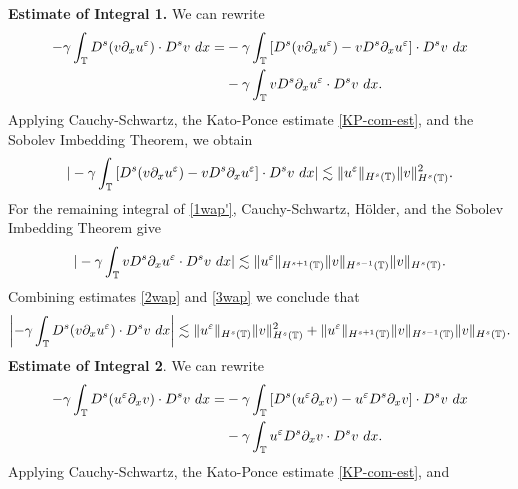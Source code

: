{\bf Estimate of Integral 1.} We can rewrite
%
%
\begin{equation}
\begin{split}
-\gamma \int_{\mathbb{T}} D^s (v \partial_x u^\varepsilon ) \cdot D^s v \
dx = & -\gamma \int_{\mathbb{T}} \left[ D^s(v \partial_x u^\varepsilon) - v D^s
\partial_x u^\varepsilon \right] \cdot D^s v \ dx
\\
& -  \gamma \int_{\mathbb{T}} v D^s \partial_x u^\varepsilon \cdot D^s v \ dx.
\label{1wap'}
\end{split}
\end{equation}
%
%
%
%
%
%
Applying Cauchy-Schwartz, the Kato-Ponce estimate \eqref{KP-com-est}, and the Sobolev 
Imbedding Theorem, we obtain 
%
%
%
%
\begin{equation}
\begin{split}
| -\gamma \int_{\mathbb{T}} \left[ D^s(v \partial_x u^\varepsilon ) - v D^s
\partial_x u^\varepsilon \right] \cdot D^s v \ dx |
\lesssim \|u^\varepsilon \|_{H^s(\mathbb{T})} \|v\|_{H^s(\mathbb{T})}^2.
\label{2wap}
\end{split}
\end{equation}
%
%
For the remaining integral of \eqref{1wap'}, Cauchy-Schwartz, H\"older, and the Sobolev 
Imbedding Theorem give
%
%
%
\begin{equation}
\begin{split}
  | - \gamma \int_{\mathbb{T}} v D^s \partial_x u^{\varepsilon} \cdot D^s v \ dx |
\lesssim \|u^\varepsilon \|_{H^{s+1}(\mathbb{T})} \|v\|_{H^{s-1}(\mathbb{T})}
\|v\|_{H^s(\mathbb{T})}.
\label{3wap}
\end{split}
\end{equation}
%
%
Combining estimates \eqref{2wap} and \eqref{3wap} we conclude that
%
%
\begin{equation}
\begin{split}
\left | -\gamma \int_{\mathbb{T}} D^s (v \partial_x u^\varepsilon ) \cdot D^s v \
dx \right | \lesssim \|u^\varepsilon \|_{H^s(\mathbb{T})} \|v\|_{H^s(\mathbb{T})}^2 + \|u^\varepsilon 
\|_{H^{s+1}(\mathbb{T})} \|v\|_{H^{s-1}(\mathbb{T})}
\|v\|_{H^s(\mathbb{T})}.
\label{4wap}
\end{split}
\end{equation}
%
%
%
{\bf Estimate of Integral 2}. We can rewrite
%
%
\begin{equation}
\begin{split}
-\gamma \int_{\mathbb{T}} D^s (u^\varepsilon \partial_x v) \cdot D^s v \
dx
= & -\gamma \int_{\mathbb{T}} \left[ D^s(u^\varepsilon \partial_x v) - u^\varepsilon D^s
\partial_x v \right] \cdot D^s v \ dx
\\
& -  \gamma \int_{\mathbb{T}} u^\varepsilon D^s \partial_x v \cdot D^s v \ dx.
\label{1wa'}
\end{split}
\end{equation}
%
%
Applying Cauchy-Schwartz, the Kato-Ponce estimate \eqref{KP-com-est}, and 
